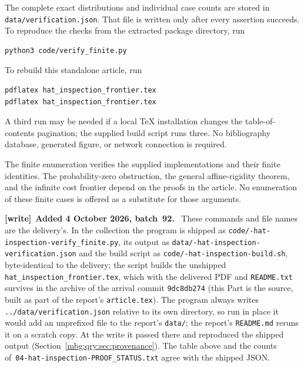 \documentclass[11pt,letterpaper]{article}
\theoremstyle{definition}
\newenvironment{writenote}[1][]{\par\smallskip\begingroup\small
 \noindent\textbf{[write]}\if\relax\detokenize{#1}\relax\else~\textbf{#1.}\fi\ }%
 {\par\endgroup\smallskip}
\begin{document}
The complete exact distributions and individual case counts are stored
in \nolinkurl{data/verification.json}. That file is written only after
every assertion succeeds. To reproduce the checks from the extracted
package directory, run
\begin{lstlisting}
python3 code/verify_finite.py
\end{lstlisting}
To rebuild this standalone article, run
\begin{lstlisting}
pdflatex hat_inspection_frontier.tex
pdflatex hat_inspection_frontier.tex
\end{lstlisting}
A third run may be needed if a local TeX installation changes the
table-of-contents pagination; the supplied build script runs three.
No bibliography database, generated figure, or network connection is
required.

The finite enumeration verifies the supplied implementations and their
finite identities. The probability-zero obstruction, the general
affine-rigidity theorem, and the infinite cost frontier depend on the
proofs in the article. No enumeration of these finite cases is offered
as a substitute for those arguments.

\begin{writenote}[Added 4 October 2026, batch~92]
These commands and file names are the delivery's. In the collection the program is shipped as \texttt{code/-hat-inspection-\allowbreak verify\_\allowbreak finite.py}, its output as \texttt{data/-hat-inspection-\allowbreak verification.json} and the build script as \texttt{code/-hat-inspection-\allowbreak build.sh}, byte-identical to the delivery; the script builds the unshipped \texttt{hat\_\allowbreak inspection\_\allowbreak frontier.tex}, which with the delivered PDF and \texttt{README.txt} survives in the archive of the arrival commit \texttt{9dc8db274} (this Part is the source, built as part of the report's \texttt{article.tex}). The program always writes \texttt{../data/\allowbreak verification.json} relative to its own directory, so run in place it would add an unprefixed file to the report's \texttt{data/}; the report's \texttt{README.md} reruns it on a scratch copy. At the write it passed there and reproduced the shipped output (Section~\ref{mbg:qry:sec:provenance}). The table above and the counts of~\texttt{04-hat-inspection-\allowbreak PROOF\_\allowbreak STATUS.txt} agree with the shipped JSON.
\end{writenote}
\end{document}
